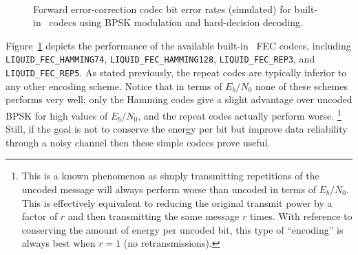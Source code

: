 \begin{figure}
\centering
\mbox{
} \quad
\mbox{
   \quad
}
\caption{Forward error-correction codec bit error rates (simulated)
         for built-in \liquid\ codecs
         using BPSK modulation and hard-decision decoding.}
\label{fig:fec:hamming_ber}
\end{figure}
%
Figure~\ref{fig:fec:hamming_ber} depicts the performance of the
available built-in \liquid\ FEC codecs, including
{\tt LIQUID\_FEC\_HAMMING74},
{\tt LIQUID\_FEC\_HAMMING128},
{\tt LIQUID\_FEC\_REP3}, and
{\tt LIQUID\_FEC\_REP5}.
As stated previously, the repeat codes are typically inferior to any
other encoding scheme.
Notice that in terms of $E_b/N_0$ none of these schemes performs very
well;
only the Hamming codes give a slight advantage over uncoded BPSK for
high values of $E_b/N_0$,
and the repeat codes actually perform worse.%
\footnote{This is a known phenomenon as simply transmitting repetitions
          of the uncoded message will always perform worse than uncoded
          in terms of $E_b/N_0$.
          This is effectively equivalent to reducing the original
          transmit power by a factor of $r$ and then transmitting the
          same message $r$ times.
          With reference to conserving the amount of energy per uncoded
          bit, this type of ``encoding'' is always best when $r=1$
          (no retransmissions).}
Still, if the goal is not to conserve the energy per bit but improve
data reliability through a noisy channel then these simple codecs prove
useful.


